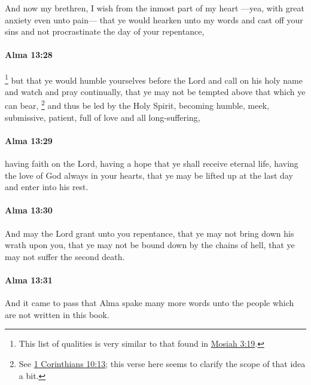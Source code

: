 			And now my brethren, I wish from the inmost part of my heart
			---yea, with great anxiety even unto pain---
			that ye would hearken unto my words and cast off your sins
			and not procrastinate the day of your repentance,

		\paragraph{Alma 13:28} %
			\label{ALMA-13-28}

				\footnote{%
					This list of qualities is very similar to that found in \hyperref[MOSIAH-3-19]{Mosiah 3:19}.
					}%
			but that ye would humble yourselves before the Lord
			and call on his holy name and watch and pray continually,
			that ye may not be tempted above that which ye can bear,%
				\footnote{%
					See \hyperref[1CORINTHIANS-10-13]{1 Corinthians 10:13}; this verse here seems to clarify the scope of that idea a bit.
					}
			and thus be led by the Holy Spirit,
			becoming humble, meek, submissive, patient, full of love and all long-suffering,

		\paragraph{Alma 13:29} %
			\label{ALMA-13-29}

			having faith on the Lord,
			having a hope that ye shall receive eternal life,
			having the love of God always in your hearts,
			that ye may be lifted up at the last day and enter into his rest.

		\paragraph{Alma 13:30} %
			\label{ALMA-13-30}

			And may the Lord grant unto you repentance,
			that ye may not bring down his wrath upon you,
			that ye may not be bound down by the chains of hell,
			that ye may not suffer the second death.

		\paragraph{Alma 13:31} %
			\label{ALMA-13-31}

			And it came to pass that
			Alma spake many more words unto the people
			which are not written in this book.

